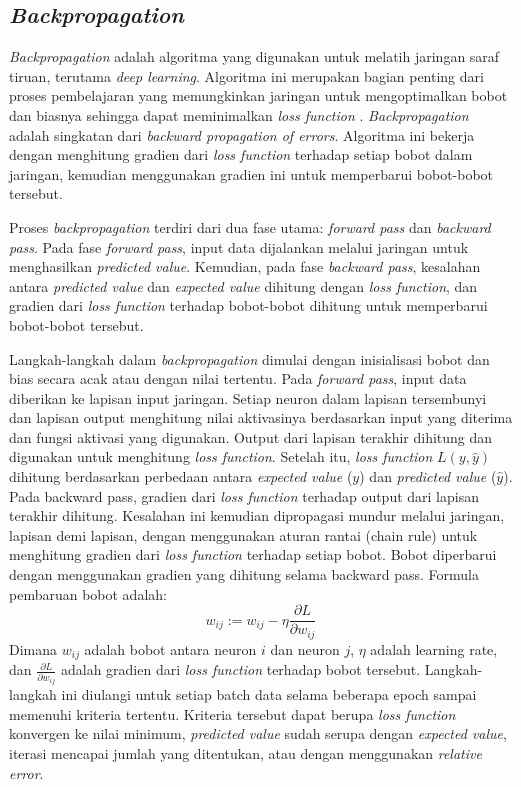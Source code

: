\subsection{\textit{Backpropagation}}

\textit{Backpropagation} adalah algoritma yang digunakan untuk melatih jaringan saraf tiruan, terutama \textit{deep learning}. Algoritma ini merupakan bagian penting dari proses pembelajaran yang memungkinkan jaringan untuk mengoptimalkan bobot dan biasnya sehingga dapat meminimalkan \textit{loss function} \cite{bishop_2006}. \textit{Backpropagation} adalah singkatan dari \textit{backward propagation of errors}. Algoritma ini bekerja dengan menghitung gradien dari \textit{loss function} terhadap setiap bobot dalam jaringan, kemudian menggunakan gradien ini untuk memperbarui bobot-bobot tersebut.

Proses \textit{backpropagation} terdiri dari dua fase utama: \textit{forward pass} dan \textit{backward pass}. Pada fase \textit{forward pass}, input data dijalankan melalui jaringan untuk menghasilkan \textit{predicted value}. Kemudian, pada fase \textit{backward pass}, kesalahan antara \textit{predicted value} dan \textit{expected value} dihitung dengan \textit{loss function}, dan gradien dari \textit{loss function} terhadap bobot-bobot dihitung untuk memperbarui bobot-bobot tersebut.

Langkah-langkah dalam \textit{backpropagation} dimulai dengan inisialisasi bobot dan bias secara acak atau dengan nilai tertentu. Pada \textit{forward pass}, input data diberikan ke lapisan input jaringan. Setiap neuron dalam lapisan tersembunyi dan lapisan output menghitung nilai aktivasinya berdasarkan input yang diterima dan fungsi aktivasi yang digunakan. Output dari lapisan terakhir dihitung dan digunakan untuk menghitung \textit{loss function}. Setelah itu, \textit{loss function} \( L(y, \hat{y}) \) dihitung berdasarkan perbedaan antara \textit{expected value} (\( y \)) dan \textit{predicted value} (\( \hat{y} \)). Pada backward pass, gradien dari \textit{loss function} terhadap output dari lapisan terakhir dihitung. Kesalahan ini kemudian dipropagasi mundur melalui jaringan, lapisan demi lapisan, dengan menggunakan aturan rantai (chain rule) untuk menghitung gradien dari \textit{loss function} terhadap setiap bobot. Bobot diperbarui dengan menggunakan gradien yang dihitung selama backward pass. Formula pembaruan bobot adalah:
\[
w_{ij} := w_{ij} - \eta \frac{\partial L}{\partial w_{ij}}
\]
Dimana \( w_{ij} \) adalah bobot antara neuron \( i \) dan neuron \( j \), \( \eta \) adalah learning rate, dan \( \frac{\partial L}{\partial w_{ij}} \) adalah gradien dari \textit{loss function} terhadap bobot tersebut. Langkah-langkah ini diulangi untuk setiap batch data selama beberapa epoch sampai memenuhi kriteria tertentu. Kriteria tersebut dapat berupa \textit{loss function} konvergen ke nilai minimum, \textit{predicted value} sudah serupa dengan \textit{expected value}, iterasi mencapai jumlah yang ditentukan, atau dengan menggunakan \textit{relative error}.

